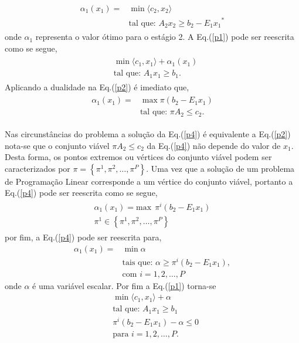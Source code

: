 \documentclass[12pt,fleqn]{article}
\begin{document}
\begin{align}
  \begin{split}	
	\alpha_{1} (x_1) =& \min \langle c_2,x_2\rangle \\
	&\mbox{tal que: }A_2 x_2 \geq b_2 - {E_1 x_1}^{*} 
  \end{split}
    \label{p3}
\end{align}
onde ${\alpha}_{1}$ representa o valor \'otimo para o est\'agio 2. A Eq.(\ref{p1}) pode ser reescrita como se segue,
\begin{align}
  \begin{split}	
  &\min \langle c_1,x_1\rangle + {\alpha}_{1}(x_1) \\
&\mbox{tal que: }	A_1x_1 \geq b_1.
\end{split}
  \end{align}
Aplicando a dualidade na Eq.(\ref{p2}) \'e imediato que,
\begin{align}
  \begin{split}	
 \alpha_{1}(x_1) = &\max \pi (b_2 - E_1x_1 ) \\
	&\mbox{tal que: }\pi A_2  \leq c_2.
  \end{split}
 	\label{p4}
\end{align}

Nas circunst\^ancias do problema a solu\c c\~ao da Eq.(\ref{p4}) \'e equivalente a Eq.(\ref{p2})
nota-se que o conjunto vi\'avel $\pi A_2 \leq c_2$ da Eq.(\ref{p4}) n\~ao depende do valor de $x_1$. Desta forma, os
pontos extremos ou v\'ertices do conjunto vi\'avel podem ser caracterizados por $\pi = \left\{ \pi^1, \pi^2, \dots,
\pi^P \right\}$. Uma vez
que a solu\c c\~ao de um problema de Programa\c c\~ao Linear corresponde  a um v\'ertice do conjunto vi\'avel,
portanto a Eq.(\ref{p4}) pode ser reescrita como se segue,
\begin{align*}
  \begin{aligned}
	{\alpha}_{1}(x_1) = \text {max} \ \ {\pi}^{i} (b_2 - E_1x_1) \\
	{\pi}^{1} \in \left\{ {\pi}^{1}, {\pi}^{2},\dots, {\pi}^{P} \right\}
  \end{aligned}
	\label{p5}
\end{align*}
por fim, a Eq.(\ref{p4}) pode ser reescrita para, 
\begin{align*}
  	\alpha_{1}(x_1) =& \min\alpha \nonumber\\ 
	&\mbox{tais que: }\alpha \geq \pi^{i}(b_2 - E_1 x_1),\nonumber\\ &\mbox{com } i = 1,2, \dots , P
	\label{p6}
\end{align*}
onde $\alpha$ \'e uma vari\'avel escalar. Por fim a Eq.(\ref{p1}) torna-se
\begin{align*}
&\min \langle c_1,x_1\rangle + \alpha \nonumber\\
&\mbox{tal que: }	A_1 x_1 \geq b_1 \nonumber\\
&	\pi^{i}(b_2 - E_1x_1) - \alpha \leq 0\nonumber \\ 
&\mbox{para }	i = 1, 2, \dots , P.
	\label{p7}
\end{align*}
\end{document}
